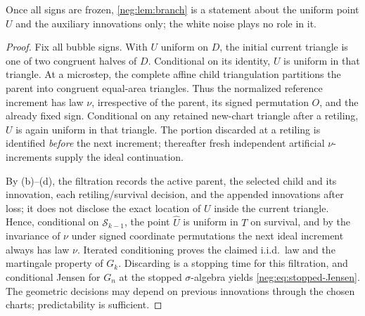 \documentclass[11pt]{article}
\theoremstyle{definition}
\theoremstyle{remark}
\numberwithin{equation}{section}
\begin{document}
Once all signs are frozen, \cref{neg:lem:branch} is a statement about
the uniform point $U$ and the auxiliary innovations only; the white
noise plays no role in it.

\begin{proof}
Fix all bubble signs. With $U$ uniform on $D$, the initial
current triangle is one of two congruent halves of $D$. Conditional
on its identity, $U$ is uniform in that triangle. At a microstep,
the complete affine child triangulation partitions the parent into
congruent equal-area triangles. Thus the normalized reference
increment has law $\nu$, irrespective of the parent, its signed
permutation $O$, and the already fixed sign. Conditional on any
retained new-chart triangle after a retiling, $U$ is again uniform
in that triangle. The portion discarded at a retiling is identified
\emph{before} the next increment; thereafter fresh independent
artificial $\nu$-increments supply the ideal continuation.

By (b)--(d), the filtration records the active parent, the
selected child and its innovation, each retiling/survival decision,
and the appended innovations after loss; it does not disclose the
exact location of $U$ inside the current triangle. Hence,
conditional on $\mathcal S_{k-1}$, the point $\widehat U$ is uniform
in $T$ on survival, and by the invariance of $\nu$ under signed
coordinate permutations the next ideal increment always has law $\nu$.
Iterated conditioning proves the claimed i.i.d.\ law and the martingale
property of $G_k$. Discarding is a stopping time for this filtration,
and conditional Jensen for $G_n$ at the stopped $\sigma$-algebra yields
\eqref{neg:eq:stopped-Jensen}. The geometric decisions may depend on
previous innovations through the chosen charts; predictability is
sufficient.
\end{proof}
\end{document}
